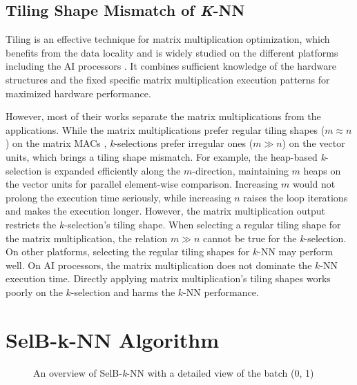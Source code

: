 \documentclass[12pt]{extbook}
\begin{document}
\subsection{Tiling Shape Mismatch of \textit{K}-NN \label{sec:tiling}}

Tiling is an effective technique for matrix multiplication optimization, which benefits from the data locality and is widely studied on the different platforms including the AI processors \cite{DBLP:conf/ppopp/Li0YJL19, DBLP:conf/ppopp/NiuLJS0022, DBLP:conf/ppopp/HongSNSS19, DBLP:conf/ipps/00020C20, DBLP:conf/ppopp/FengWCZ0D21, DBLP:conf/micro/ZhaoD20}. It combines sufficient knowledge of the hardware structures and the fixed specific matrix multiplication execution patterns for maximized hardware performance.

However, most of their works separate the matrix multiplications from the applications. While the matrix multiplications prefer regular tiling shapes ($m \approx n$) on the matrix MACs \cite{DBLP:conf/ipps/00020C20}, \textit{k}-selections prefer irregular ones ($m \gg n$) on the vector units, which brings a tiling shape mismatch. For example, the heap-based \textit{k}-selection is expanded efficiently along the $m$-direction, maintaining $m$ heaps on the vector units for parallel element-wise comparison. Increasing $m$ would not prolong the execution time seriously, while increasing $n$ raises the loop iterations and makes the execution longer. However, the matrix multiplication output restricts the $k$-selection's tiling shape. When selecting a regular tiling shape for the matrix multiplication, the relation $m \gg n$ cannot be true for the \textit{k}-selection. On other platforms, selecting the regular tiling shapes for $k$-NN may perform well. On AI processors, the matrix multiplication does not dominate the $k$-NN execution time. Directly applying matrix multiplication's tiling shapes works poorly on the $k$-selection and harms the $k$-NN performance.


\section{SelB-k-NN Algorithm}

\begin{figure}[t]
    \caption{An overview of SelB-\textit{k}-NN with a detailed view of the batch (0, 1)}
    \label{fig:tiling}
    \end{figure}
\end{document}
